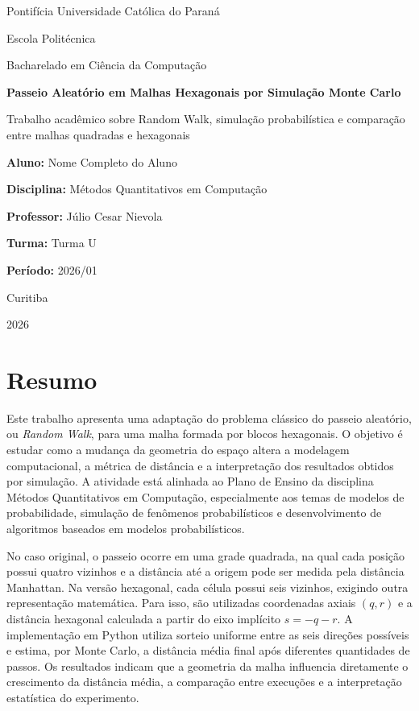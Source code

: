 \documentclass[12pt,a4paper]{article}
\newcommand{\aluno}{Nome Completo do Aluno}
\newcommand{\disciplina}{Métodos Quantitativos em Computação}
\newcommand{\professor}{Júlio Cesar Nievola}
\newcommand{\curso}{Bacharelado em Ciência da Computação}
\newcommand{\turma}{Turma U}
\newcommand{\instituicao}{Pontifícia Universidade Católica do Paraná}
\newcommand{\titulo}{Passeio Aleatório em Malhas Hexagonais por Simulação Monte Carlo}
\newcommand{\descricao}{Trabalho acadêmico sobre Random Walk, simulação probabilística e comparação entre malhas quadradas e hexagonais}
\begin{document}
\begin{titlepage}
    \begin{center}
        \instituicao

        Escola Politécnica

        \curso

        \vfill

        {\bfseries\Large \titulo\par}

        \vspace{1cm}

        {\large \descricao\par}

        \vfill

        \begin{flushleft}
            \textbf{Aluno:} \aluno

            \textbf{Disciplina:} \disciplina

            \textbf{Professor:} \professor

            \textbf{Turma:} \turma

            \textbf{Período:} 2026/01
        \end{flushleft}

        \vfill

        Curitiba

        2026
    \end{center}
\end{titlepage}

\newpage
\section*{Resumo}

Este trabalho apresenta uma adaptação do problema clássico do passeio aleatório, ou \textit{Random Walk}, para uma malha formada por blocos hexagonais. O objetivo é estudar como a mudança da geometria do espaço altera a modelagem computacional, a métrica de distância e a interpretação dos resultados obtidos por simulação. A atividade está alinhada ao Plano de Ensino da disciplina \disciplina, especialmente aos temas de modelos de probabilidade, simulação de fenômenos probabilísticos e desenvolvimento de algoritmos baseados em modelos probabilísticos.

No caso original, o passeio ocorre em uma grade quadrada, na qual cada posição possui quatro vizinhos e a distância até a origem pode ser medida pela distância Manhattan. Na versão hexagonal, cada célula possui seis vizinhos, exigindo outra representação matemática. Para isso, são utilizadas coordenadas axiais $(q,r)$ e a distância hexagonal calculada a partir do eixo implícito $s=-q-r$. A implementação em Python utiliza sorteio uniforme entre as seis direções possíveis e estima, por Monte Carlo, a distância média final após diferentes quantidades de passos. Os resultados indicam que a geometria da malha influencia diretamente o crescimento da distância média, a comparação entre execuções e a interpretação estatística do experimento.
\end{document}
